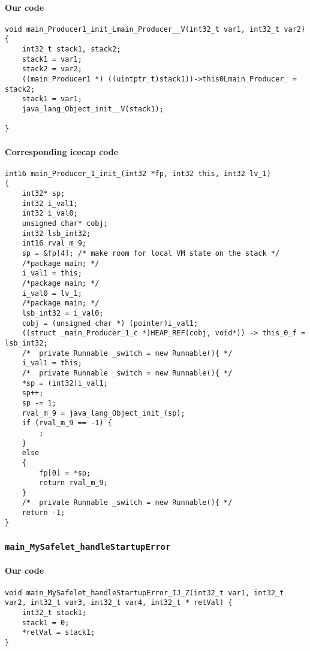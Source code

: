 \paragraph{Our code}\hfill
\begin{lstlisting}[firstnumber=1318]
void main_Producer1_init_Lmain_Producer__V(int32_t var1, int32_t var2) {
	int32_t stack1, stack2;
	stack1 = var1;
	stack2 = var2;
	((main_Producer1 *) ((uintptr_t)stack1))->this0Lmain_Producer_ = stack2;
	stack1 = var1;
	java_lang_Object_init__V(stack1);

}
\end{lstlisting}

\paragraph{Corresponding icecap code}\hfill
\begin{lstlisting}[firstnumber=56358]
int16 main_Producer_1_init_(int32 *fp, int32 this, int32 lv_1)
{
	int32* sp;
	int32 i_val1;
	int32 i_val0;
	unsigned char* cobj;
	int32 lsb_int32;
	int16 rval_m_9;
	sp = &fp[4]; /* make room for local VM state on the stack */
	/*package main; */
	i_val1 = this;
	/*package main; */
	i_val0 = lv_1;
	/*package main; */
	lsb_int32 = i_val0;
	cobj = (unsigned char *) (pointer)i_val1;
	((struct _main_Producer_1_c *)HEAP_REF(cobj, void*)) -> this_0_f = lsb_int32;
	/*	private Runnable _switch = new Runnable(){ */
	i_val1 = this;
	/*	private Runnable _switch = new Runnable(){ */
	*sp = (int32)i_val1;
	sp++;
	sp -= 1;
	rval_m_9 = java_lang_Object_init_(sp);
	if (rval_m_9 == -1) {
		;
	}
	else
	{
		fp[0] = *sp;
		return rval_m_9;
	}
	/*	private Runnable _switch = new Runnable(){ */
	return -1;
}
\end{lstlisting}

\subsubsection{\texttt{main\_MySafelet\_handleStartupError}}

\paragraph{Our code}\hfill
\begin{lstlisting}[firstnumber=1328]
void main_MySafelet_handleStartupError_IJ_Z(int32_t var1, int32_t var2, int32_t var3, int32_t var4, int32_t * retVal) {
	int32_t stack1;
	stack1 = 0;
	*retVal = stack1;
}
\end{lstlisting}

